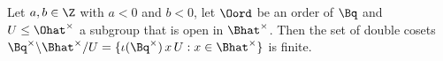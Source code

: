 Let $a,b\in\Z$ with $a<0$ and $b<0$, let $\Oord$ be an order of $\Bq$ and $U\le\Ohat^\times$ a subgroup that is open in $\Bhat^\times$.
Then the set of double cosets $\Bq^\times\backslash\Bhat^\times/U=\{\iota(\Bq^\times)\,x\,U:x\in\Bhat^\times\}$ is finite.

